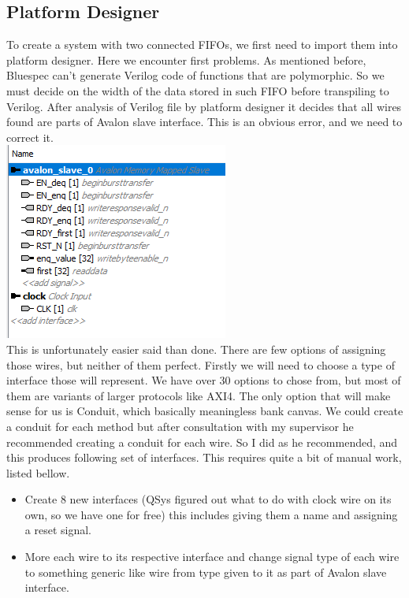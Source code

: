 \documentclass[12pt]{report}
\begin{document}
\subsection{Platform Designer}
To create a system with two connected FIFOs, we first need to import them into platform designer. Here we encounter first problems. As mentioned before, Bluespec can't generate Verilog code of functions that are polymorphic. So we must decide on the width of the data stored in such FIFO before transpiling to Verilog. After analysis of Verilog file by platform designer it decides that all wires found are parts of Avalon slave interface. This is an obvious error, and we need to correct it. \\
\includegraphics{images/Example1BeforeOranization.png} \\
This is unfortunately easier said than done. There are few options of assigning those wires, but neither of them perfect. Firstly we will need to choose a type of interface those will represent. We have over 30 options to chose from, but most of them are variants of larger protocols like AXI4. The only option that will make sense for us is Conduit, which basically meaningless bank canvas. We could create a conduit for each method but after consultation with my supervisor he recommended creating a conduit for each wire. So I did as he recommended, and this produces following set of interfaces. This requires quite a bit of manual work, listed bellow.
\begin{itemize}
    \item Create 8 new interfaces (QSys figured out what to do with clock wire on its own, so we have one for free) this includes giving them a name and assigning a reset signal.
    \item More each wire to its respective interface and change signal type of each wire to something generic like wire from type given to it as part of Avalon slave interface. 
\end{itemize}
\end{document}
